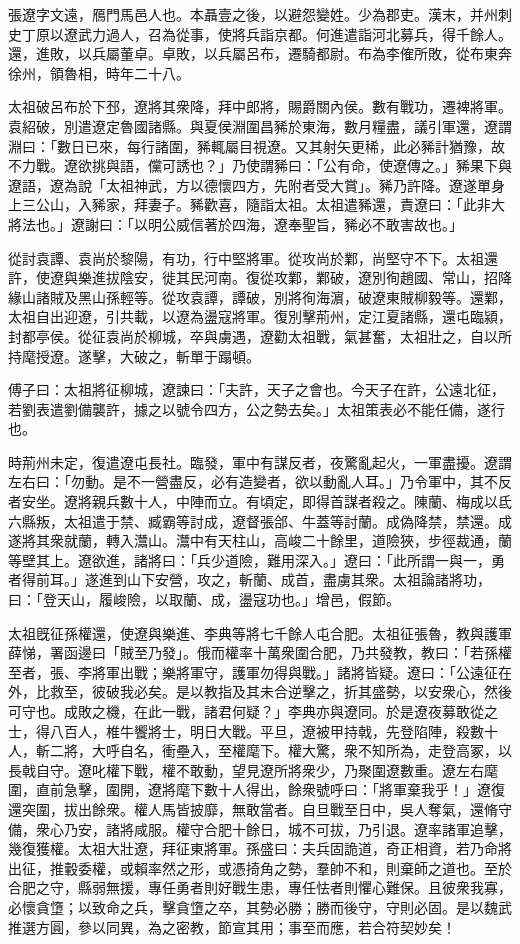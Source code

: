 
\begin{pinyinscope}
張遼字文遠，鴈門馬邑人也。本聶壹之後，以避怨變姓。少為郡吏。漢末，并州刺史丁原以遼武力過人，召為從事，使將兵詣京都。何進遣詣河北募兵，得千餘人。還，進敗，以兵屬董卓。卓敗，以兵屬呂布，遷騎都尉。布為李傕所敗，從布東奔徐州，領魯相，時年二十八。

太祖破呂布於下邳，遼將其衆降，拜中郎將，賜爵關內侯。數有戰功，遷裨將軍。袁紹破，別遣遼定魯國諸縣。與夏侯淵圍昌豨於東海，數月糧盡，議引軍還，遼謂淵曰：「數日已來，每行諸圍，豨輒屬目視遼。又其射矢更稀，此必豨計猶豫，故不力戰。遼欲挑與語，儻可誘也？」乃使謂豨曰：「公有命，使遼傳之。」豨果下與遼語，遼為說「太祖神武，方以德懷四方，先附者受大賞」。豨乃許降。遼遂單身上三公山，入豨家，拜妻子。豨歡喜，隨詣太祖。太祖遣豨還，責遼曰：「此非大將法也。」遼謝曰：「以明公威信著於四海，遼奉聖旨，豨必不敢害故也。」

從討袁譚、袁尚於黎陽，有功，行中堅將軍。從攻尚於鄴，尚堅守不下。太祖還許，使遼與樂進拔陰安，徙其民河南。復從攻鄴，鄴破，遼別徇趙國、常山，招降緣山諸賊及黑山孫輕等。從攻袁譚，譚破，別將徇海濵，破遼東賊柳毅等。還鄴，太祖自出迎遼，引共載，以遼為盪寇將軍。復別擊荊州，定江夏諸縣，還屯臨潁，封都亭侯。從征袁尚於柳城，卒與虜遇，遼勸太祖戰，氣甚奮，太祖壯之，自以所持麾授遼。遂擊，大破之，斬單于蹋頓。

傅子曰：太祖將征柳城，遼諫曰：「夫許，天子之會也。今天子在許，公遠北征，若劉表遣劉備襲許，據之以號令四方，公之勢去矣。」太祖策表必不能任備，遂行也。

時荊州未定，復遣遼屯長社。臨發，軍中有謀反者，夜驚亂起火，一軍盡擾。遼謂左右曰：「勿動。是不一營盡反，必有造變者，欲以動亂人耳。」乃令軍中，其不反者安坐。遼將親兵數十人，中陣而立。有頃定，即得首謀者殺之。陳蘭、梅成以氐六縣叛，太祖遣于禁、臧霸等討成，遼督張郃、牛蓋等討蘭。成偽降禁，禁還。成遂將其衆就蘭，轉入灊山。灊中有天柱山，高峻二十餘里，道險狹，步徑裁通，蘭等壁其上。遼欲進，諸將曰：「兵少道險，難用深入。」遼曰：「此所謂一與一，勇者得前耳。」遂進到山下安營，攻之，斬蘭、成首，盡虜其衆。太祖論諸將功，曰：「登天山，履峻險，以取蘭、成，盪寇功也。」增邑，假節。

太祖旣征孫權還，使遼與樂進、李典等將七千餘人屯合肥。太祖征張魯，教與護軍薛悌，署函邊曰「賊至乃發」。俄而權率十萬衆圍合肥，乃共發教，教曰：「若孫權至者，張、李將軍出戰；樂將軍守，護軍勿得與戰。」諸將皆疑。遼曰：「公遠征在外，比救至，彼破我必矣。是以教指及其未合逆擊之，折其盛勢，以安衆心，然後可守也。成敗之機，在此一戰，諸君何疑？」李典亦與遼同。於是遼夜募敢從之士，得八百人，椎牛饗將士，明日大戰。平旦，遼被甲持戟，先登陷陣，殺數十人，斬二將，大呼自名，衝壘入，至權麾下。權大驚，衆不知所為，走登高冢，以長戟自守。遼叱權下戰，權不敢動，望見遼所將衆少，乃聚圍遼數重。遼左右麾圍，直前急擊，圍開，遼將麾下數十人得出，餘衆號呼曰：「將軍棄我乎！」遼復還突圍，拔出餘衆。權人馬皆披靡，無敢當者。自旦戰至日中，吳人奪氣，還脩守備，衆心乃安，諸將咸服。權守合肥十餘日，城不可拔，乃引退。遼率諸軍追擊，幾復獲權。太祖大壯遼，拜征東將軍。孫盛曰：夫兵固詭道，奇正相資，若乃命將出征，推轂委權，或賴率然之形，或憑掎角之勢，羣帥不和，則棄師之道也。至於合肥之守，縣弱無援，專任勇者則好戰生患，專任怯者則懼心難保。且彼衆我寡，必懷貪墯；以致命之兵，擊貪墯之卒，其勢必勝；勝而後守，守則必固。是以魏武推選方圓，參以同異，為之密教，節宣其用；事至而應，若合符契妙矣！


\end{pinyinscope}
